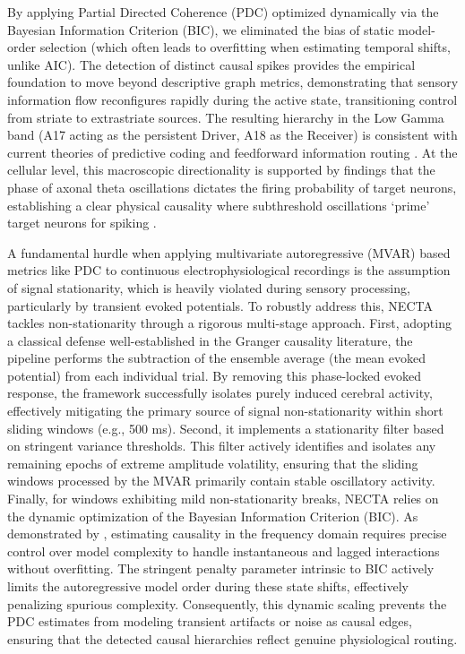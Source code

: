 By applying Partial Directed Coherence (PDC) optimized dynamically via the Bayesian Information Criterion (BIC), we eliminated the bias of static model-order selection (which often leads to overfitting when estimating temporal shifts, unlike AIC). The detection of distinct causal spikes provides the empirical foundation to move beyond descriptive graph metrics, demonstrating that sensory information flow reconfigures rapidly during the active state, transitioning control from striate to extrastriate sources. The resulting hierarchy in the Low Gamma band (A17 acting as the persistent Driver, A18 as the Receiver) is consistent with current theories of predictive coding and feedforward information routing \cite{vezoli2021}. At the cellular level, this macroscopic directionality is supported by findings that the phase of axonal theta oscillations dictates the firing probability of target neurons, establishing a clear physical causality where subthreshold oscillations `prime' target neurons for spiking \cite{Lassers2026}. 

A fundamental hurdle when applying multivariate autoregressive (MVAR) based metrics like PDC to continuous electrophysiological recordings is the assumption of signal stationarity, which is heavily violated during sensory processing, particularly by transient evoked potentials. To robustly address this, NECTA tackles non-stationarity through a rigorous multi-stage approach. First, adopting a classical defense well-established in the Granger causality literature, the pipeline performs the subtraction of the ensemble average (the mean evoked potential) from each individual trial. By removing this phase-locked evoked response, the framework successfully isolates purely induced cerebral activity, effectively mitigating the primary source of signal non-stationarity within short sliding windows (e.g., 500 ms). Second, it implements a stationarity filter based on stringent variance thresholds. This filter actively identifies and isolates any remaining epochs of extreme amplitude volatility, ensuring that the sliding windows processed by the MVAR primarily contain stable oscillatory activity. Finally, for windows exhibiting mild non-stationarity breaks, NECTA relies on the dynamic optimization of the Bayesian Information Criterion (BIC). As demonstrated by \cite{Faes_2010}, estimating causality in the frequency domain requires precise control over model complexity to handle instantaneous and lagged interactions without overfitting. The stringent penalty parameter intrinsic to BIC actively limits the autoregressive model order during these state shifts, effectively penalizing spurious complexity. Consequently, this dynamic scaling prevents the PDC estimates from modeling transient artifacts or noise as causal edges, ensuring that the detected causal hierarchies reflect genuine physiological routing.

